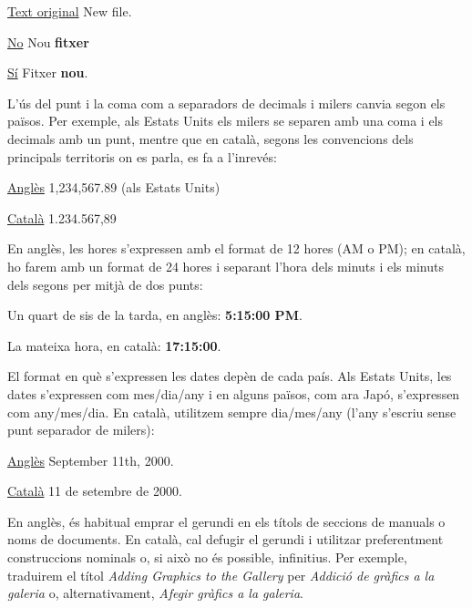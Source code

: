 \documentclass[9pt]{cheatsheet}
\begin{document}
\begin{multicols*}{3}
\underline {Text original} New file.

\underline {No} Nou \textbf{fitxer}

\underline {Sí} Fitxer \textbf{nou}.




L’ús del punt i la coma com a separadors de decimals i milers canvia segon els països. Per exemple, als Estats Units els milers se separen amb una coma i els decimals amb un punt, mentre que en català, segons les convencions dels principals territoris on es parla, es fa a l’inrevés:

\underline {Anglès} 1,234,567.89 (als Estats Units)

\underline {Català} 1.234.567,89



En anglès, les hores s’expressen amb el format de 12 hores (AM o PM); en català, ho farem amb un format de 24 hores i separant l’hora dels minuts i els minuts dels segons per mitjà de dos punts:

Un quart de sis de la tarda, en anglès: \textbf{5:15:00 PM}.

La mateixa hora, en català: \textbf{17:15:00}.


El format en què s’expressen les dates depèn de cada país. Als Estats Units, les dates s’expressen com mes/dia/any i en alguns països, com ara Japó, s’expressen com any/mes/dia. En català, utilitzem sempre dia/mes/any (l’any s’escriu sense punt separador de milers):

\underline {Anglès} September 11th, 2000.

\underline {Català}	11 de setembre de 2000.



En anglès, és habitual emprar el gerundi en els títols de seccions de manuals o noms de documents. En català, cal defugir el gerundi i utilitzar preferentment construccions nominals o, si això no és possible, infinitius. Per exemple, traduirem el títol \emph{Adding Graphics to the Gallery} per \emph{Addició de gràfics a la galeria} o, alternativament, \emph{Afegir gràfics a la galeria}.



\end{multicols*}
\end{document}
